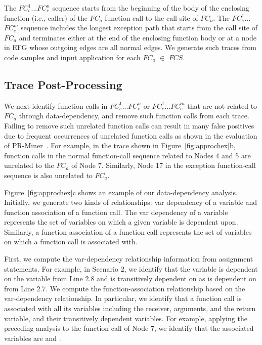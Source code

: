 The $FC_c^1$...$FC_c^n$ sequence starts from the beginning of the 
body of the enclosing function (i.e., caller) of the $FC_a$ function call
to the call site of $FC_a$. The $FC_e^1$...$FC_e^m$ sequence 
includes the longest exception path that starts from the call site of $FC_a$
and terminates either at the end of the enclosing function body 
or at a node in EFG whose outgoing edges are all normal edges. We generate such traces 
from code samples and input application for each $FC_a$ $\in$ $FCS$.

\subsection{Trace Post-Processing}
\vspace*{-2ex}

We next identify function calls in $FC_c^1$...$FC_c^n$ or $FC_e^1$...$FC_e^m$
that are not related to $FC_a$ through data-dependency, and 
remove such function calls from each trace. Failing to remove
such unrelated function calls can result in many false positives 
due to frequent occurrences of unrelated function 
calls as shown in the evaluation of PR-Miner~\cite{Zhenmin2005PRMiner}. 
For example, in the trace shown in Figure~\ref{fig:approchex}b,
function calls in the normal function-call sequence related to Nodes 4 and 5
are unrelated to the $FC_a$ of Node 7. Similarly, Node 17 in the exception function-call 
sequence is also unrelated to $FC_a$. 

Figure~\ref{fig:approchex}c shows an example of our data-dependency analysis.
Initially, we generate two kinds of relationships: var dependency of a variable 
and function association of a function call. 
The var dependency of a variable represents the set of variables on which a given variable is dependent upon.
Similarly, a function association of a function call represents the set of variables on which 
a function call is associated with. 

First, we compute the var-dependency relationship information from assignment statements.
For example, in Scenario 2, we identify that the variable  is dependent on 
the variable  from Line 2.8 and is transitively dependent on 
as  is dependent on  from Line 2.7. 
We compute the function-association relationship based on the var-dependency relationship.
In particular, we identify that a function call is associated with all its variables including the
receiver, arguments, and the return variable, and their transitively dependent variables.
For example, applying the preceding analysis to the function call of Node 7, 
we identify that the associated variables are  and .

